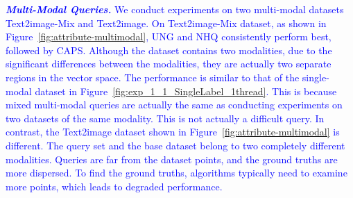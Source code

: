 \documentclass[sigconf, nonacm]{acmart}
\begin{document}
{%
	\textit{\textbf{\textcolor{blue}{Multi-Modal Queries.}}} \textcolor{blue}{
	We conduct experiments on two multi-modal  datasets Text2image-Mix and Text2image. 
On Text2image-Mix dataset, as shown in Figure~\ref{fig:attribute-multimodal}, UNG and NHQ consistently perform best, followed by CAPS.
Although the dataset contains two modalities, due to the significant differences between the modalities, they are actually two separate regions in the vector space. The performance is similar to that of the single-modal dataset in Figure~\ref{fig:exp_1_1_SingleLabel_1thread}. This is because mixed multi-modal queries are actually the same as conducting experiments on two datasets of the same modality. This is not actually a difficult query.
		In contrast, the Text2image dataset shown in Figure~\ref{fig:attribute-multimodal} is different. The query set and the base dataset belong to two completely different modalities. Queries are far from the dataset points, and the ground truths are more dispersed. To find the ground truths, algorithms typically need to examine more points, which leads to degraded performance.
}}
\end{document}
